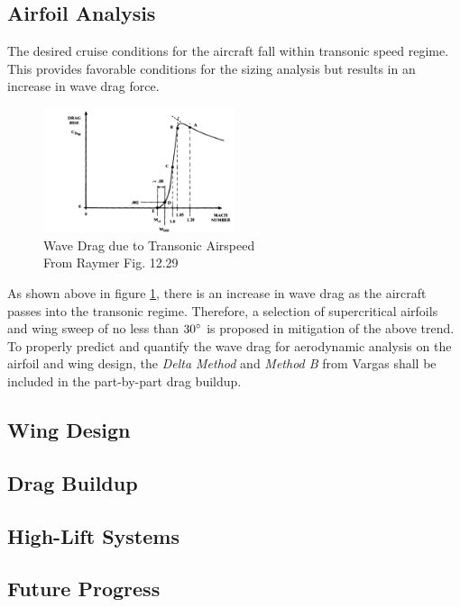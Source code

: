 \subsection{Airfoil Analysis}
The desired cruise conditions for the aircraft fall within transonic speed regime.  This provides favorable conditions for the sizing analysis but results in an increase in wave drag force.

\begin{figure}
    \centering
    \includegraphics[width=0.5\textwidth]{Photos/wavedragduetotransonic.png}
    \caption{Wave Drag due to Transonic Airspeed\\{\small From Raymer Fig. 12.29\cite{raymer}}}
    \label{fig:transonic}
\end{figure}

As shown above in figure \ref{fig:transonic}, there is an increase in wave drag as the aircraft passes into the transonic regime.  Therefore, a selection of supercritical airfoils and wing sweep of no less than $30\degree$ is proposed in mitigation of the above trend.  To properly predict and quantify the wave drag for aerodynamic analysis on the airfoil and wing design, the \textit{Delta Method} and \textit{Method B} from Vargas\cite{vargas} shall be included in the part-by-part drag buildup.

\subsection{Wing Design}

\subsection{Drag Buildup}

\subsection{High-Lift Systems}

\subsection{Future Progress}


